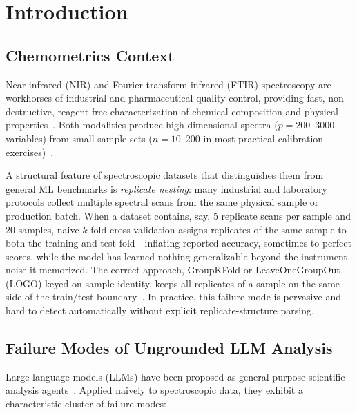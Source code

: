 
\section{Introduction}
\label{sec:introduction}

\subsection{Chemometrics Context}

Near-infrared (NIR) and Fourier-transform infrared (FTIR) spectroscopy are
workhorses of industrial and pharmaceutical quality control, providing fast,
non-destructive, reagent-free characterization of chemical composition and
physical properties~\citep{pasquini2003nir}.
Both modalities produce high-dimensional spectra ($p = 200$--$3000$ variables)
from small sample sets ($n = 10$--$200$ in most practical calibration
exercises)~\citep{martens1989multivariate,rinnan2009review}.

A structural feature of spectroscopic datasets that distinguishes them from
general ML benchmarks is \emph{replicate nesting}: many industrial and
laboratory protocols collect multiple spectral scans from the same physical
sample or production batch.
When a dataset contains, say, 5 replicate scans per sample and 20 samples,
naive $k$-fold cross-validation assigns replicates of the same sample to both
the training and test fold---inflating reported accuracy, sometimes to
perfect scores, while the model has learned nothing generalizable beyond the
instrument noise it memorized.
The correct approach, GroupKFold or LeaveOneGroupOut (LOGO) keyed on sample
identity, keeps all replicates of a sample on the same side of the
train/test boundary~\citep{kaufman2012leakage}.
In practice, this failure mode is pervasive and hard to detect automatically
without explicit replicate-structure parsing.

\subsection{Failure Modes of Ungrounded LLM Analysis}

Large language models (LLMs) have been proposed as general-purpose scientific
analysis agents~\citep{yao2023react,schick2023toolformer}.
Applied naively to spectroscopic data, they exhibit a characteristic cluster
of failure modes:

